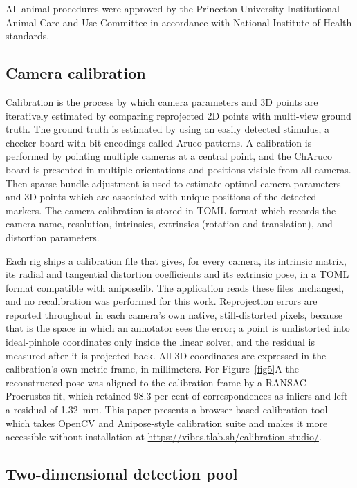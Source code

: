 \documentclass[pdflatex, sn-nature]{sn-jnl}
\theoremstyle{thmstyleone}%
\theoremstyle{thmstyletwo}%
\theoremstyle{thmstylethree}%
\begin{document}
All animal procedures were approved by the Princeton University Institutional Animal Care and Use Committee in accordance with National Institute of Health standards.


\subsection{Camera calibration}\label{methods-calibration}

Calibration is the process by which camera parameters and 3D points are iteratively estimated by comparing reprojected 2D points with multi-view ground truth. The ground truth is estimated by using an easily detected stimulus, a checker board with bit encodings called Aruco patterns. A calibration is performed by pointing multiple cameras at a central point, and the ChAruco board is presented in multiple orientations and positions visible from all cameras. Then sparse bundle adjustment is used to estimate optimal camera parameters and 3D points which are associated with unique positions of the detected markers. The camera calibration is stored in TOML format which records the camera name, resolution, intrinsics, extrinsics (rotation and translation), and distortion parameters.

Each rig ships a calibration file that gives, for every camera, its intrinsic matrix, its radial and tangential distortion coefficients and its extrinsic pose, in a TOML format compatible with aniposelib. The application reads these files unchanged, and no recalibration was performed for this work. Reprojection errors are reported throughout in each camera's own native, still-distorted pixels, because that is the space in which an annotator sees the error; a point is undistorted into ideal-pinhole coordinates only inside the linear solver, and the residual is measured after it is projected back. All 3D coordinates are expressed in the calibration's own metric frame, in millimeters. For Figure~\ref{fig5}A the reconstructed pose was aligned to the calibration frame by a RANSAC-Procrustes fit, which retained 98.3 per cent of correspondences as inliers and left a residual of 1.32~mm. This paper presents a browser-based calibration tool which takes OpenCV and Anipose-style calibration suite and makes it more accessible without installation at \url{https://vibes.tlab.sh/calibration-studio/}.

\subsection{Two-dimensional detection pool}\label{methods-pool}
\end{document}
